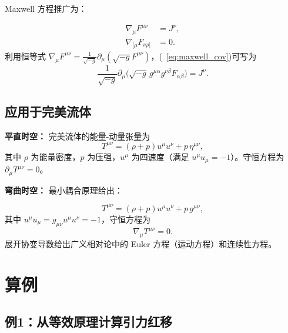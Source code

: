 Maxwell 方程推广为：
\begin{theorem}
\begin{align}
    \nabla_\mu F^{\mu\nu} &= J^\nu, \label{eq:maxwell_cov} \\
    \nabla_{[\mu}F_{\nu\rho]} &= 0. \label{eq:maxwell_bianchi}
\end{align}
利用恒等式 $\nabla_\mu F^{\mu\nu} = \frac{1}{\sqrt{-g}}\partial_\mu(\sqrt{-g}F^{\mu\nu})$，(~\ref{eq:maxwell_cov})可写为
\begin{equation}
    \boxed{\frac{1}{\sqrt{-g}} \partial_\mu\bigl(\sqrt{-g}\,g^{\mu\alpha}g^{\nu\beta}F_{\alpha\beta}\bigr) = J^\nu}.
\end{equation}
\end{theorem}

\subsection{应用于完美流体}

\textbf{平直时空：} 完美流体的能量-动量张量为
\begin{equation}
    T^{\mu\nu} = (\rho + p) u^\mu u^\nu + p \, \eta^{\mu\nu},
\end{equation}
其中 $\rho$ 为能量密度，$p$ 为压强，$u^\mu$ 为四速度（满足 $u^\mu u_\mu = -1$）。守恒方程为 $\partial_\mu T^{\mu\nu} = 0$。

\textbf{弯曲时空：} 最小耦合原理给出：
\begin{theorem}[弯曲时空完美流体]
\begin{equation}
    \boxed{T^{\mu\nu} = (\rho + p) u^\mu u^\nu + p \, g^{\mu\nu}},
\end{equation}
其中 $u^\mu u_\mu = g_{\mu\nu}u^\mu u^\nu = -1$，守恒方程为
\begin{equation}
    \boxed{\nabla_\mu T^{\mu\nu} = 0}.
\end{equation}
展开协变导数给出广义相对论中的 Euler 方程（运动方程）和连续性方程。
\end{theorem}

\section{算例}

\subsection{例1：从等效原理计算引力红移}

